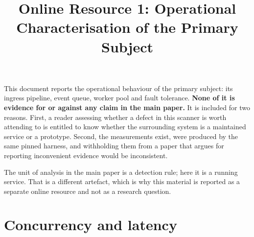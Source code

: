 \documentclass[pdflatex,sn-basic]{sn-jnl}
\begin{document}
\title{Online Resource 1: Operational Characterisation of the Primary Subject}

\author*[1]{ }



\maketitle

This document reports the operational behaviour of the primary subject: its ingress pipeline, event queue, worker pool and fault tolerance. \textbf{None of it is evidence for or against any claim in the main paper.} It is included for two reasons. First, a reader assessing whether a defect in this scanner is worth attending to is entitled to know whether the surrounding system is a maintained service or a prototype. Second, the measurements exist, were produced by the same pinned harness, and withholding them from a paper that argues for reporting inconvenient evidence would be inconsistent.

The unit of analysis in the main paper is a detection rule; here it is a running service. That is a different artefact, which is why this material is reported as a separate online resource and not as a research question.

\section{Concurrency and latency}
\end{document}
